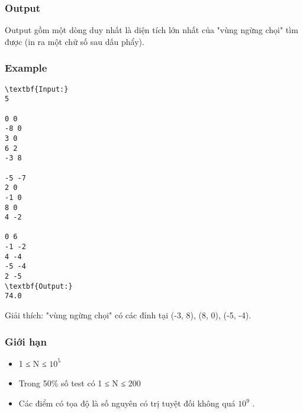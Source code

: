 \subsubsection{   Output  }

   Output gồm một dòng duy nhất là diện tích lớn nhất của "vùng ngừng chọi" tìm được (in ra một chữ số sau dấu phẩy).  

\subsubsection{   Example  }
\begin{verbatim}
\textbf{Input:}
5

0 0
-8 0
3 0
6 2
-3 8

-5 -7
2 0
-1 0
8 0
4 -2

0 6
-1 -2
4 -4
-5 -4
2 -5
\textbf{Output:}
74.0\end{verbatim}

Giải thích: "vùng ngừng chọi" có các đỉnh tại (-3, 8), (8, 0), (-5, -4).

\subsubsection{   Giới hạn  }
\begin{itemize}
	\item     1 ≤ N ≤ $10^{5}$
	\item     Trong 50\% số test có 1 ≤ N ≤ 200   
	\item     Các điểm có tọa độ là số nguyên có trị tuyệt đối không quá $10^{9}$    .   
\end{itemize}
